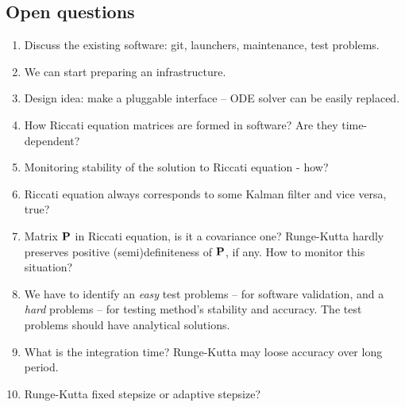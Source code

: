 \documentclass[]{article}
\begin{document}
\subsection{Open questions}
\begin{enumerate}
\item Discuss the existing software: git, launchers, maintenance, test problems.
\item We can start preparing an infrastructure.
\item Design idea: make a pluggable interface -- ODE solver can be easily replaced.
\item How Riccati equation matrices are formed in software? Are they time-dependent?
\item Monitoring stability of the solution to Riccati equation - how?
\item Riccati equation always corresponds to some Kalman filter and vice versa, true?
\item Matrix ${\bf P}$ in Riccati equation, is it a covariance one? Runge-Kutta hardly preserves positive (semi)definiteness of ${\bf P}$, if any. How to monitor this situation?
\item We have to identify an \textit{easy} test problems -- for software validation, and a \textit{hard} problems -- for testing method's stability and accuracy. The test problems should have analytical solutions.
\item What is the integration time? Runge-Kutta may loose accuracy over long period.
\item Runge-Kutta fixed stepsize or adaptive stepsize?
\end{enumerate}
\end{document}
